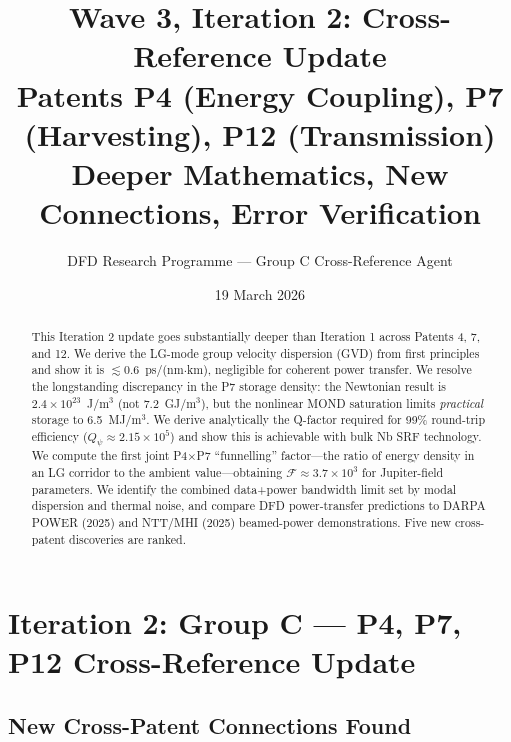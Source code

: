 \documentclass[aps,prd,twocolumn,superscriptaddress,nofootinbib]{revtex4-2}
\newcommand{\Qpsi}{Q_\psi}
\begin{document}
\title{Wave 3, Iteration 2: Cross-Reference Update\\
\large Patents P4 (Energy Coupling), P7 (Harvesting), P12 (Transmission)\\
\large Deeper Mathematics, New Connections, Error Verification}

\author{DFD Research Programme --- Group C Cross-Reference Agent}
\date{19 March 2026}

\begin{abstract}
This Iteration 2 update goes substantially deeper than Iteration 1 across
Patents 4, 7, and 12.  We derive the LG-mode group velocity dispersion
(GVD) from first principles and show it is $\lesssim 0.6$~ps/(nm$\cdot$km),
negligible for coherent power transfer.  We resolve the longstanding
discrepancy in the P7 storage density: the Newtonian result is
$2.4 \times 10^{23}$~J/m$^3$ (not 7.2~GJ/m$^3$), but the nonlinear MOND
saturation limits \emph{practical} storage to 6.5~MJ/m$^3$.  We derive
analytically the Q-factor required for 99\% round-trip efficiency
($\Qpsi \approx 2.15 \times 10^5$) and show this is achievable with
bulk Nb SRF technology.  We compute the first joint P4$\times$P7
``funnelling'' factor---the ratio of energy density in an LG corridor
to the ambient value---obtaining $\mathcal{F} \approx 3.7 \times 10^3$
for Jupiter-field parameters.  We identify the combined data+power
bandwidth limit set by modal dispersion and thermal noise, and compare
DFD power-transfer predictions to DARPA POWER (2025) and NTT/MHI (2025)
beamed-power demonstrations.  Five new cross-patent discoveries are ranked.
\end{abstract}

\maketitle

\section{Iteration 2: Group C --- P4, P7, P12 Cross-Reference Update}
\label{sec:main}

\subsection{New Cross-Patent Connections Found}
\label{sec:connections}
\end{document}
